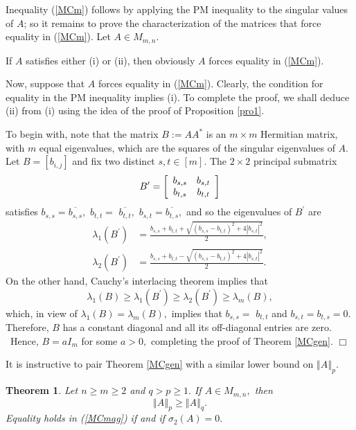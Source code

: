 \documentclass[12pt]{article}%
\newtheorem{theorem}{Theorem}[section]
\newenvironment{proof}[1][Proof]{\noindent{\textbf {#1}  }}  {\hfill$\Box$\bigskip}
\begin{document}
\begin{proof}
Inequality (\ref{MCm}) follows by applying the PM inequality to the singular
values of $A$; so it remains to prove the characterization of the matrices
that force equality in (\ref{MCm}). Let $A\in M_{m,n}.$

If $A$ satisfies either (i) or (ii), then obviously $A$ forces equality in
(\ref{MCm}).

Now, suppose that $A$ forces equality in (\ref{MCm}). Clearly, the condition
for equality in the PM inequality implies (i). To complete the proof, we shall
deduce (ii) from (i) using the idea of the proof of Proposition \ref{pro1}.

To begin with, note that the matrix $B:=AA^{\ast}$ is an $m\times m$ Hermitian
matrix, with $m$ equal eigenvalues, which are the squares of the singular
eigenvalues of $A$. Let $B=\left[  b_{i,j}\right]  $ and fix two distinct
$s,t\in\left[  m\right]  $. The $2\times2$ principal submatrix
\[
B^{\prime}=\left[
\begin{array}
[c]{cc}%
b_{s,s} & b_{s,t}\\
b_{t,s} & b_{t,t}%
\end{array}
\right]
\]
satisfies $b_{s,s}=\overline{b_{s,s}},$ $b_{t,t}=$ $\overline{b_{t,t}},$
$b_{s,t}=\overline{b_{t,s}},$ and so the eigenvalues of $B^{\prime}$ are
\begin{align*}
\lambda_{1}\left(  B^{\prime}\right)   &  =\frac{b_{s,s}+b_{t,t}+\sqrt{\left(
b_{s,s}-b_{t,t}\right)  ^{2}+4\left\vert b_{s,t}\right\vert ^{2}}}{2},\\
\lambda_{2}\left(  B^{\prime}\right)   &  =\frac{b_{s,s}+b_{t,t}-\sqrt{\left(
b_{s,s}-b_{t,t}\right)  ^{2}+4\left\vert b_{s,t}\right\vert ^{2}}}{2}.
\end{align*}
On the other hand, Cauchy's interlacing theorem implies that
\[
\lambda_{1}\left(  B\right)  \geq\lambda_{1}\left(  B^{\prime}\right)
\geq\lambda_{2}\left(  B^{\prime}\right)  \geq\lambda_{m}\left(  B\right)  ,
\]
which, in view of $\lambda_{1}\left(  B\right)  =\lambda_{m}\left(  B\right)
,$ implies that $b_{s,s}=$ $b_{t,t}$ and $b_{s,t}=b_{t,s}=0.$ Therefore, $B$
has a constant diagonal and all its off-diagonal entries are zero. \ Hence,
$B=aI_{m}$ for some $a>0,$ completing the proof of Theorem \ref{MCgen}.
\end{proof}

It is instructive to pair Theorem \ref{MCgen} with a similar lower bound on
$\left\Vert A\right\Vert _{p}$.

\begin{theorem}
\label{MCabsg}Let $n\geq m\geq2$ and $q>p\geq1.$ If $A\in M_{m,n},$ then
\begin{equation}
\left\Vert A\right\Vert _{p}\geq\left\Vert A\right\Vert _{q}. \label{MCmag}%
\end{equation}
Equality holds in (\ref{MCmag}) if and if $\sigma_{2}\left(  A\right)  =0.$
\end{theorem}
\end{document}
